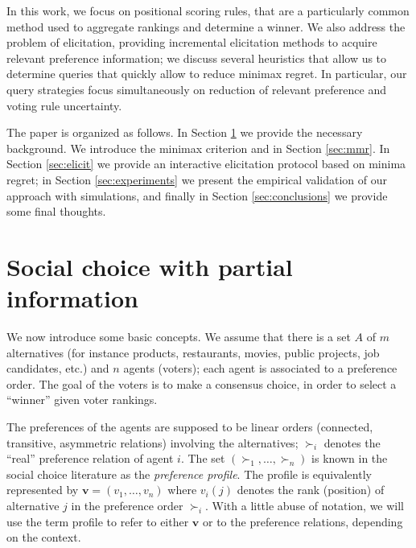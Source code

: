 \documentclass[12pt]{article}
\newcommand{\pref}{\succ}%
\newcommand{\profile}{\textbf{v}}%
\begin{document}
In this work, we focus on positional scoring rules, that  are a particularly common method used to aggregate rankings and determine  a winner.
We also address the problem of elicitation, providing incremental elicitation methods to acquire relevant preference information; we discuss  several heuristics that allow us to determine queries that quickly allow to reduce minimax regret.
In particular, our query strategies  focus simultaneously on reduction of relevant preference and voting rule uncertainty.

The paper is organized as follows.
In Section \ref{sec:background} we provide the necessary background.
We introduce the minimax criterion and in Section \ref{sec:mmr}.
In Section \ref{sec:elicit} we provide an interactive elicitation protocol based on minima regret;  in Section \ref{sec:experiments} we present the empirical validation of our approach with simulations, and finally in Section \ref{sec:conclusions} we provide some final thoughts.



\section{Social choice with partial information}\label{sec:background}

We now introduce some basic concepts.
We assume that there is a set $A$ of $m$ alternatives (for instance products, restaurants, movies, public projects, job candidates, etc.) and $n$ agents (voters); each agent is associated to a preference order.
The goal of the voters is to make a consensus choice, in order to select a ``winner'' given voter rankings.

The preferences of the agents are supposed to be linear orders (connected, transitive, asymmetric relations) involving the alternatives;
$\pref_i$ denotes the ``real'' preference relation of agent $i$. 
The set $(\pref_1,\ldots,\pref_n)$ is known in the social choice literature as the {\em preference  profile}.
The profile is equivalently represented by $\profile=(v_1,\ldots,v_n)$ where $v_i(j)$ denotes the rank (position) of alternative $j$ in the preference order $\pref_i$. 
With a little abuse of notation, we will use the term profile to refer to either $\profile$ or to the preference relations, depending on the context.
\end{document}
